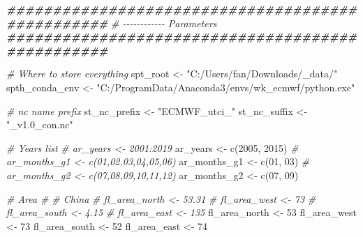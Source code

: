 \documentclass[
]{book}
\newenvironment{Shaded}{\begin{snugshade}}{\end{snugshade}}
\newcommand{\CommentTok}[1]{\textcolor[rgb]{0.56,0.35,0.01}{\textit{#1}}}
\newcommand{\DecValTok}[1]{\textcolor[rgb]{0.00,0.00,0.81}{#1}}
\newcommand{\DocumentationTok}[1]{\textcolor[rgb]{0.56,0.35,0.01}{\textbf{\textit{#1}}}}
\newcommand{\FunctionTok}[1]{\textcolor[rgb]{0.00,0.00,0.00}{#1}}
\newcommand{\NormalTok}[1]{#1}
\newcommand{\OtherTok}[1]{\textcolor[rgb]{0.56,0.35,0.01}{#1}}
\newcommand{\StringTok}[1]{\textcolor[rgb]{0.31,0.60,0.02}{#1}}
\begin{document}
\begin{Shaded}
\begin{Highlighting}[]
\DocumentationTok{\#\#\#\#\#\#\#\#\#\#\#\#\#\#\#\#\#\#\#\#\#\#\#\#\#\#\#\#\#\#\#\#\#\#\#\#\#\#\#\#\#\#\#\#\#\#\#\#\#}
\CommentTok{\# {-}{-}{-}{-}{-}{-}{-}{-}{-}{-}{-}{-} Parameters}
\DocumentationTok{\#\#\#\#\#\#\#\#\#\#\#\#\#\#\#\#\#\#\#\#\#\#\#\#\#\#\#\#\#\#\#\#\#\#\#\#\#\#\#\#\#\#\#\#\#\#\#\#\#}

\CommentTok{\# Where to store everything}
\NormalTok{spt\_root }\OtherTok{\textless{}{-}} \StringTok{"C:/Users/fan/Downloads/\_data/"}
\NormalTok{spth\_conda\_env }\OtherTok{\textless{}{-}} \StringTok{"C:/ProgramData/Anaconda3/envs/wk\_ecmwf/python.exe"}

\CommentTok{\# nc name prefix}
\NormalTok{st\_nc\_prefix }\OtherTok{\textless{}{-}} \StringTok{"ECMWF\_utci\_"}
\NormalTok{st\_nc\_suffix }\OtherTok{\textless{}{-}} \StringTok{"\_v1.0\_con.nc"}

\CommentTok{\# Years list}
\CommentTok{\# ar\_years \textless{}{-} 2001:2019}
\NormalTok{ar\_years }\OtherTok{\textless{}{-}} \FunctionTok{c}\NormalTok{(}\DecValTok{2005}\NormalTok{, }\DecValTok{2015}\NormalTok{)}
\CommentTok{\# ar\_months\_g1 \textless{}{-} c(\textquotesingle{}01\textquotesingle{},\textquotesingle{}02\textquotesingle{},\textquotesingle{}03\textquotesingle{},\textquotesingle{}04\textquotesingle{},\textquotesingle{}05\textquotesingle{},\textquotesingle{}06\textquotesingle{})}
\NormalTok{ar\_months\_g1 }\OtherTok{\textless{}{-}} \FunctionTok{c}\NormalTok{(}\StringTok{\textquotesingle{}01\textquotesingle{}}\NormalTok{, }\StringTok{\textquotesingle{}03\textquotesingle{}}\NormalTok{)}
\CommentTok{\# ar\_months\_g2 \textless{}{-} c(\textquotesingle{}07\textquotesingle{},\textquotesingle{}08\textquotesingle{},\textquotesingle{}09\textquotesingle{},\textquotesingle{}10\textquotesingle{},\textquotesingle{}11\textquotesingle{},\textquotesingle{}12\textquotesingle{})}
\NormalTok{ar\_months\_g2 }\OtherTok{\textless{}{-}} \FunctionTok{c}\NormalTok{(}\StringTok{\textquotesingle{}07\textquotesingle{}}\NormalTok{, }\StringTok{\textquotesingle{}09\textquotesingle{}}\NormalTok{)}

\CommentTok{\# Area}
\CommentTok{\# \# China}
\CommentTok{\# fl\_area\_north \textless{}{-} 53.31}
\CommentTok{\# fl\_area\_west \textless{}{-} 73}
\CommentTok{\# fl\_area\_south \textless{}{-} 4.15}
\CommentTok{\# fl\_area\_east \textless{}{-} 135}
\NormalTok{fl\_area\_north }\OtherTok{\textless{}{-}} \DecValTok{53}
\NormalTok{fl\_area\_west }\OtherTok{\textless{}{-}} \DecValTok{73}
\NormalTok{fl\_area\_south }\OtherTok{\textless{}{-}} \DecValTok{52}
\NormalTok{fl\_area\_east }\OtherTok{\textless{}{-}} \DecValTok{74}


\end{Highlighting}
\end{Shaded}
\end{document}
